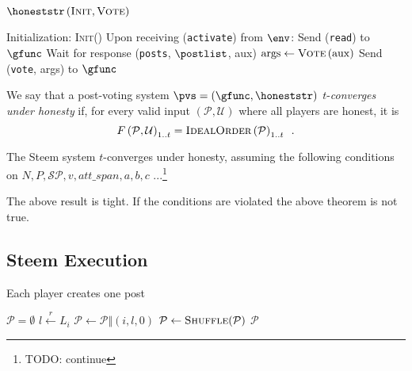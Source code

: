     \begin{algorithm}[H]
      \caption{$\honeststr\left(\textsc{Init}, \textsc{Vote}\right)$}
      \label{alg:honest}
      \begin{algorithmic}[1]
        \State Initialization:
        \Indent
          \State \textsc{Init}()
        \EndIndent
        \State
        \State Upon receiving (\texttt{activate}) from $\env$:
        \Indent
          \State Send (\texttt{read}) to $\gfunc$
          \State Wait for response (\texttt{posts}, $\postlist$, aux)
          \State $\mathrm{args} \gets \textsc{Vote}\left(\mathrm{aux}\right)$
          \State Send (\texttt{vote}, args) to $\gfunc$
        \EndIndent
      \end{algorithmic}
    \end{algorithm}

    \begin{definition}
      We say that a post-voting system $\pvs = \left(\gfunc, \honeststr\right)$
      $t$-\emph{converges under honesty} if, for every valid input
      $\left(\mathcal{P}, \mathcal{U}\right)$ where all players are honest, it
      is
      \begin{equation*}
        F\left(\mathcal{P}, \mathcal{U}\right)_{1..t} =
        \textsc{IdealOrder}\left(\mathcal{P}\right)_{1..t} \enspace.
      \end{equation*}
    \end{definition}

    \begin{theorem}
      The Steem system $t$-converges under honesty, assuming the following
      conditions on $N, P, \mathcal{SP}, v, att\_span, a, b, c$
      ...\footnote{TODO: continue}
    \end{theorem}

    The above result is tight.
    If the conditions are violated the above theorem is not true.

  \subsection{Steem Execution}
    \begin{algorithm}
      \caption{Each player creates one post}
      \label{alg:postGen}
      \begin{algorithmic}[1]
        \State $\mathcal{P} = \emptyset$ 
           \State $l \xleftarrow{r} L_i$
           \State $\mathcal{P} \leftarrow \mathcal{P} \Vert \left(i, l, 0\right)$
        \EndFor
        \State $\mathcal{P} \leftarrow \textsc{Shuffle}(\mathcal{P})$
        \State \Return $\mathcal{P}$
      \EndFunction
      \end{algorithmic}
    \end{algorithm}

